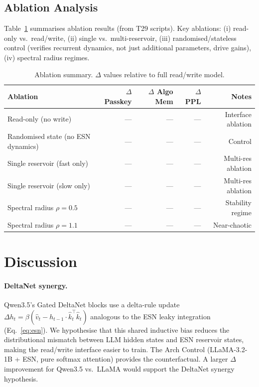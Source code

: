 \documentclass[11pt,a4paper]{article}
\theoremstyle{definition}
\begin{document}
\subsection{Ablation Analysis}
\label{sec:ablations}

Table~\ref{tab:ablations} summarises ablation results (from T29 scripts).
Key ablations: (i) read-only vs.\ read/write, (ii) single vs.\ multi-reservoir,
(iii) randomised/stateless control (verifies recurrent dynamics, not just
additional parameters, drive gains), (iv) spectral radius regimes.

\begin{table}[h]
\centering
\caption{Ablation summary. $\Delta$ values relative to full read/write model.}
\label{tab:ablations}
\begin{tabular}{@{}lrrrr@{}}
\toprule
Ablation & $\Delta$ Passkey & $\Delta$ Algo Mem & $\Delta$ PPL & Notes \\
\midrule
Read-only (no write) & --- & --- & --- & Interface ablation \\
Randomised state (no ESN dynamics) & --- & --- & --- & Control \\
Single reservoir (fast only) & --- & --- & --- & Multi-res ablation \\
Single reservoir (slow only) & --- & --- & --- & Multi-res ablation \\
Spectral radius $\rho=0.5$ & --- & --- & --- & Stability regime \\
Spectral radius $\rho=1.1$ & --- & --- & --- & Near-chaotic \\
\bottomrule
\end{tabular}
\end{table}

\section{Discussion}
\label{sec:discussion}

\paragraph{DeltaNet synergy.}
Qwen3.5's Gated DeltaNet blocks use a delta-rule update $\Delta h_t = \beta
(\hat{v}_t - h_{t-1} \cdot \hat{k}_t^\top \hat{k}_t)$ analogous to the ESN
leaky integration (Eq.~\ref{eq:esn}).  We hypothesise that this shared
inductive bias reduces the distributional mismatch between LLM hidden states
and ESN reservoir states, making the read/write interface easier to train.
The Arch Control (LLaMA-3.2-1B + ESN, pure softmax attention) provides the
counterfactual.  A larger $\Delta$ improvement for Qwen3.5 vs.\ LLaMA would
support the DeltaNet synergy hypothesis.
\end{document}
